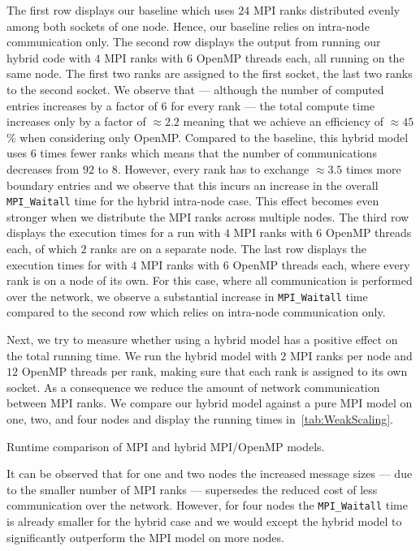 \documentclass[11pt]{article}
\begin{document}
    The first row displays our baseline which uses $24$ MPI ranks distributed
    evenly among both sockets of one node.
    Hence, our baseline relies on intra-node communication only.
    The second row displays the output from running our hybrid code with $4$
    MPI ranks with $6$ OpenMP threads each, all running on the same node.
    The first two ranks are assigned to the first socket, the last two ranks
    to the second socket.
    We observe that --- although the number of computed entries increases
    by a factor of $6$ for every rank --- the total compute time increases
    only by a factor of $\approx 2.2$ meaning that we achieve an efficiency
    of $\approx 45$\% when considering only OpenMP.\@
    Compared to the baseline, this hybrid model uses $6$ times fewer ranks
    which means that the number of communications decreases from $92$ to $8$.
    However, every rank has to exchange $\approx 3.5$ times more boundary
    entries and we observe that this incurs an increase in the overall
    \lstinline{MPI_Waitall} time for the hybrid intra-node case.
    This effect becomes even stronger when we distribute the MPI ranks
    across multiple nodes.
    The third row displays the execution times for a run with $4$ MPI ranks
    with $6$ OpenMP threads each, of which $2$ ranks are on a separate node.
    The last row displays the execution times for with $4$ MPI ranks
    with $6$ OpenMP threads each, where every rank is on a node of its own.
    For this case, where all communication is performed over the network, we
    observe a substantial increase in \lstinline{MPI_Waitall} time compared to
    the second row which relies on intra-node communication only.

    Next, we try to measure whether using a hybrid model has a positive effect
    on the total running time.
    We run the hybrid model with $2$ MPI ranks per node and $12$ OpenMP
    threads per rank, making sure that each rank is assigned to its own socket.
    As a consequence we reduce the amount of network communication between MPI
    ranks.
    We compare our hybrid model against a pure MPI model on one, two, and
    four nodes and display the running times in~\cref{tab:WeakScaling}.

    \begin{table}
        \caption{Runtime comparison of MPI and hybrid MPI/OpenMP models.}
        \label{tab:WeakScaling}
        \vspace{.25cm}
        \begin{center}
            \resizebox{\textwidth}{!}{  }
        \end{center}
    \end{table}

    It can be observed that for one and two nodes the increased message
    sizes --- due to the smaller number of MPI ranks --- supersedes the
    reduced cost of less communication over the network.
    However, for four nodes the \lstinline{MPI_Waitall} time is already
    smaller for the hybrid case and we would except the hybrid model to
    significantly outperform the MPI model on more nodes.
\end{document}
